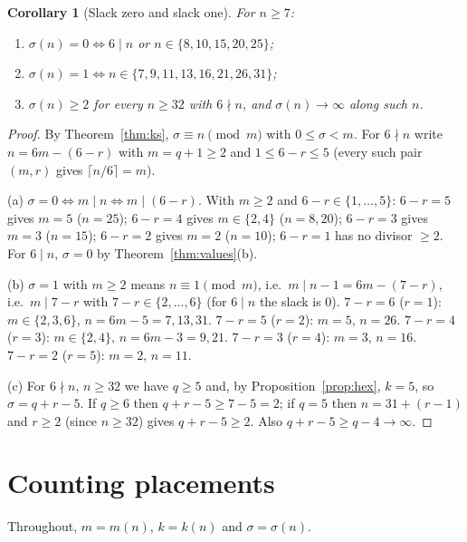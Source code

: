 \documentclass[11pt,a4paper]{article}
\newtheorem{corollary}[theorem]{Corollary}
\theoremstyle{definition}
\theoremstyle{remark}
\begin{document}
\begin{corollary}[Slack zero and slack one]\label{cor:sigma}
For $n\ge7$:
\begin{enumerate}[label=(\alph*),nosep]
\item $\sigma(n)=0\iff6\mid n$ or $n\in\{8,10,15,20,25\}$;
\item $\sigma(n)=1\iff n\in\{7,9,11,13,16,21,26,31\}$;
\item $\sigma(n)\ge2$ for every $n\ge32$ with $6\nmid n$, and $\sigma(n)\to\infty$ along such $n$.
\end{enumerate}
\end{corollary}
\begin{proof}
By Theorem~\ref{thm:ks}, $\sigma\equiv n\pmod m$ with $0\le\sigma<m$. For $6\nmid n$ write $n=6m-(6-r)$ with $m=q+1\ge2$ and $1\le6-r\le5$ (every such pair $(m,r)$ gives $\lceil n/6\rceil=m$).

(a) $\sigma=0\iff m\mid n\iff m\mid(6-r)$. With $m\ge2$ and $6-r\in\{1,\dots,5\}$: $6-r=5$ gives $m=5$ ($n=25$); $6-r=4$ gives $m\in\{2,4\}$ ($n=8,20$); $6-r=3$ gives $m=3$ ($n=15$); $6-r=2$ gives $m=2$ ($n=10$); $6-r=1$ has no divisor $\ge2$. For $6\mid n$, $\sigma=0$ by Theorem~\ref{thm:values}(b).

(b) $\sigma=1$ with $m\ge2$ means $n\equiv1\pmod m$, i.e.\ $m\mid n-1=6m-(7-r)$, i.e.\ $m\mid7-r$ with $7-r\in\{2,\dots,6\}$ (for $6\mid n$ the slack is $0$). $7-r=6$ ($r=1$): $m\in\{2,3,6\}$, $n=6m-5=7,13,31$. $7-r=5$ ($r=2$): $m=5$, $n=26$. $7-r=4$ ($r=3$): $m\in\{2,4\}$, $n=6m-3=9,21$. $7-r=3$ ($r=4$): $m=3$, $n=16$. $7-r=2$ ($r=5$): $m=2$, $n=11$.

(c) For $6\nmid n$, $n\ge32$ we have $q\ge5$ and, by Proposition~\ref{prop:hex}, $k=5$, so $\sigma=q+r-5$. If $q\ge6$ then $q+r-5\ge7-5=2$; if $q=5$ then $n=31+(r-1)$ and $r\ge2$ (since $n\ge32$) gives $q+r-5\ge2$. Also $q+r-5\ge q-4\to\infty$.
\end{proof}

\section{Counting placements}\label{sec:counting}

Throughout, $m=m(n)$, $k=k(n)$ and $\sigma=\sigma(n)$.
\end{document}
